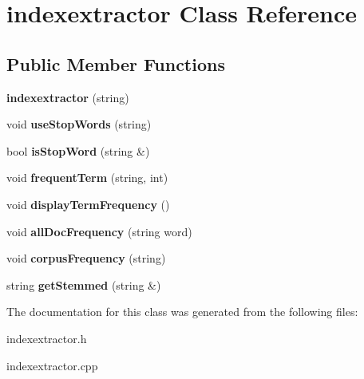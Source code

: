 \section{indexextractor Class Reference}
\label{classindexextractor}
\subsection*{Public Member Functions}
\begin{DoxyCompactItemize}
\item 
{\bfseries indexextractor} (string)\label{classindexextractor_a650a58859c23488d46e47a377766b560}

\item 
void {\bfseries use\+Stop\+Words} (string)\label{classindexextractor_a8b235e64a7c1fa2b73be3b87dce8d1f5}

\item 
bool {\bfseries is\+Stop\+Word} (string \&)\label{classindexextractor_a7f0d3c2aedcdeee8b3797582e06bfefc}

\item 
void {\bfseries frequent\+Term} (string, int)\label{classindexextractor_af51791cda58da4dd690edda61c390673}

\item 
void {\bfseries display\+Term\+Frequency} ()\label{classindexextractor_ad0fa646610510ffcc425a06170637dee}

\item 
void {\bfseries all\+Doc\+Frequency} (string word)\label{classindexextractor_a8004c942bc371ce82454f0541253abb8}

\item 
void {\bfseries corpus\+Frequency} (string)\label{classindexextractor_a3970a50364aebd629dc3a17537d7ae97}

\item 
string {\bfseries get\+Stemmed} (string \&)\label{classindexextractor_a5b6ed2949c02655b2fd4e0204ed31a25}

\end{DoxyCompactItemize}


The documentation for this class was generated from the following files\+:\begin{DoxyCompactItemize}
\item 
indexextractor.\+h\item 
indexextractor.\+cpp\end{DoxyCompactItemize}
